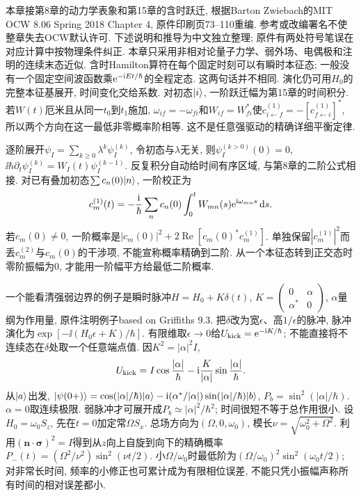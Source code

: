 本章接第8章的动力学表象和第15章的含时跃迁, 根据Barton Zwiebach的MIT OCW 8.06 Spring 2018 Chapter 4, 原件印刷页73--110重编. 参考或改编署名不使整章失去OCW默认许可. 下述说明和推导为中文独立整理; 原件有两处符号笔误在对应计算中按物理条件纠正. 本章只采用非相对论量子力学、弱外场、电偶极和注明的连续末态近似.
含时Hamilton算符在每个固定时刻可以有瞬时本征态; 一般没有一个固定空间波函数乘$\mathrm e^{-\mathrm i Et/\hbar}$的全程定态. 这两句话并不相同. 演化仍可用$H_0$的完整本征基展开, 时间变化交给系数. 对初态$\lvert i\rangle$, 一阶跃迁幅为第15章的时间积分. 若$W(t)$厄米且从同一$t_0$到$t_1$施加, $\omega_{if}=-\omega_{fi}$和$W_{if}=W_{fi}^*$使$c_{i\leftarrow f}^{(1)}=-[c_{f\leftarrow i}^{(1)}]^*$, 所以两个方向在这一最低非零概率阶相等. 这不是任意强驱动的精确详细平衡定律.

逐阶展开$\psi_I=\sum_{k\ge0}\lambda^k\psi_I^{(k)}$, 令初态与$\lambda$无关, 则$\psi_I^{(k>0)}(0)=0$, $\ii\hbar\partial_t\psi_I^{(k)}=W_I(t)\psi_I^{(k-1)}$. 反复积分自动给时间有序区域, 与第8章的二阶公式相接. 对已有叠加初态$\sum c_n(0)\lvert n\rangle$, 一阶校正为
\[
c_m^{(1)}(t)=-\frac{\mathrm i}{\hbar}\sum_n c_n(0)
\int_0^t W_{mn}(s)\mathrm e^{\mathrm i\omega_{mn}s}\,\mathrm d s.
\]
若$c_m(0)\ne0$, 一阶概率是$|c_m(0)|^2+2\operatorname{Re}[c_m(0)^*c_m^{(1)}]$. 单独保留$|c_m^{(1)}|^2$而丢$c_m^{(2)}$与$c_m(0)$的干涉项, 不能宣称概率精确到二阶. 从一个本征态转到正交态时零阶振幅为0, 才能用一阶幅平方给最低二阶概率.

一个能看清强弱边界的例子是瞬时脉冲$H=H_0+K\delta(t)$, $K=\left(\begin{smallmatrix}0&\alpha\\\alpha^*&0\end{smallmatrix}\right)$, $\alpha$量纲为作用量, 原件注明例子based on Griffiths 9.3. 把$\delta$改为宽$\epsilon$、高$1/\epsilon$的脉冲, 脉冲演化为$\exp[-\ii(H_0\epsilon+K)/\hbar]$. 有限维取$\epsilon\to0$给$U_{\rm kick}=\mathrm e^{-\mathrm i K/\hbar}$; 不能直接将不连续态在$\delta$处取一个任意端点值. 因$K^2=|\alpha|^2I$,
\[
U_{\rm kick}=I\cos\frac{|\alpha|}{\hbar}
-\mathrm i\frac{K}{|\alpha|}\sin\frac{|\alpha|}{\hbar}.
\]
从$\lvert a\rangle$出发, $\lvert \psi(0+)\rangle=\cos(|\alpha|/\hbar)\lvert a\rangle-\mathrm i(\alpha^*/|\alpha|)\sin(|\alpha|/\hbar)\lvert b\rangle$, $P_b=\sin^2(|\alpha|/\hbar)$. $\alpha=0$取连续极限. 弱脉冲才可展开成$P_b\simeq|\alpha|^2/\hbar^2$; 时间很短不等于总作用很小.
设$H_0=\omega_0S_z$, 先在$t=0$加定常$\Omega S_x$. 总场方向为$(\Omega,0,\omega_0)$, 模长$\nu=\sqrt{\omega_0^2+\Omega^2}$. 利用$(\boldsymbol n\cdot\boldsymbol\sigma)^2=I$得到从$z$向上自旋到向下的精确概率$P_-(t)=(\Omega^2/\nu^2)\sin^2(\nu t/2)$. 小$\Omega/\omega_0$时最低阶为$(\Omega/\omega_0)^2\sin^2(\omega_0t/2)$; 对非常长时间, 频率的小修正也可累计成为有限相位误差, 不能只凭小振幅声称所有时间的相对误差都小.

